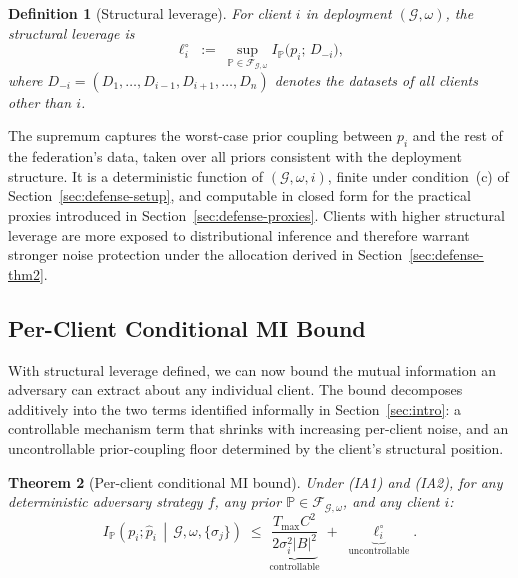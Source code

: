 \documentclass[letterpaper,journal]{IEEEtran}
\newtheorem{theorem}{Theorem}[section]
\newtheorem{definition}[theorem]{Definition}
\begin{document}
\begin{definition}[Structural leverage]
\label{def:leverage}
For client $i$ in deployment $(\mathcal{G}, \omega)$, the structural
leverage is
\[
\ell_i^\circ \;:=\; \sup_{\mathbb{P} \in \mathcal{F}_{\mathcal{G},\omega}}
I_{\mathbb{P}}\big(p_i;\, D_{-i}\big),
\]
where $D_{-i} = (D_1, \ldots, D_{i-1}, D_{i+1}, \ldots, D_n)$
denotes the datasets of all clients other than $i$.
\end{definition}

The supremum captures the worst-case prior coupling between $p_i$
and the rest of the federation's data, taken over all priors
consistent with the deployment structure. It is a deterministic
function of $(\mathcal{G}, \omega, i)$, finite under condition~(c)
of Section~\ref{sec:defense-setup}, and computable in closed form
for the practical proxies introduced in
Section~\ref{sec:defense-proxies}. Clients with higher structural
leverage are more exposed to distributional inference and therefore
warrant stronger noise protection under the allocation derived in
Section~\ref{sec:defense-thm2}.

\subsection{Per-Client Conditional MI Bound}
\label{sec:defense-thm1}

With structural leverage defined, we can now bound the mutual
information an adversary can extract about any individual client.
The bound decomposes additively into the two terms identified
informally in Section~\ref{sec:intro}: a controllable mechanism term
that shrinks with increasing per-client noise, and an uncontrollable
prior-coupling floor determined by the client's structural position.

\begin{theorem}[Per-client conditional MI bound]
\label{thm:per-client}
Under (IA1) and (IA2), for any deterministic adversary strategy $f$,
any prior $\mathbb{P} \in \mathcal{F}_{\mathcal{G},\omega}$, and any
client $i$:
\begin{equation}
I_{\mathbb{P}}\!\left(p_i;\hat{p}_i \,\middle|\,
\mathcal{G},\omega,\{\sigma_j\}\right)
\;\leq\;
\underbrace{\frac{T_{\max} C^2}{2\sigma_i^2 |B|^2}}_{\text{controllable}}
\;+\;
\underbrace{\ell_i^\circ}_{\text{uncontrollable}}.
\label{eq:thm1}
\end{equation}
\end{theorem}
\end{document}
